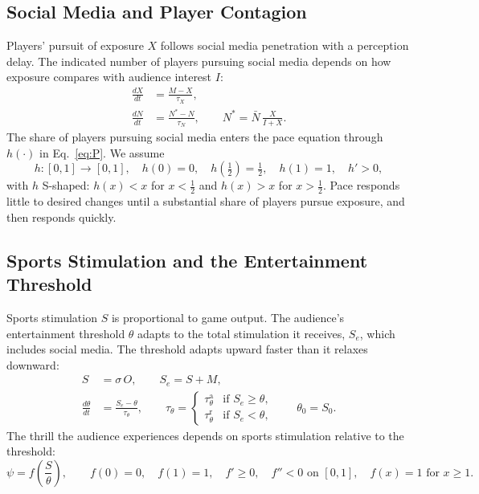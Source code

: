 \subsection{Social Media and Player Contagion}
\label{sec:model:social}

Players' pursuit of exposure $X$ follows social media penetration
with a perception delay. The indicated number of players pursuing
social media depends on how exposure compares with audience interest
$I$:
\begin{align}
  \frac{dX}{dt} &= \frac{M - X}{\tau_X},
  \label{eq:X}\\[4pt]
  \frac{dN}{dt} &= \frac{N^{*} - N}{\tau_N},
  \qquad
  N^{*} = \bar{N}\, \frac{X}{I + X}.
  \label{eq:N}
\end{align}
The share of players pursuing social media enters the pace equation
through $h(\cdot)$ in Eq.~\eqref{eq:P}. We assume
\begin{equation}
  h:[0,1]\to[0,1],\quad h(0)=0,\quad h\!\left(\tfrac12\right)=\tfrac12,
  \quad h(1)=1,\quad h'>0,
  \label{eq:h}
\end{equation}
with $h$ S-shaped: $h(x) < x$ for $x < \tfrac12$ and $h(x) > x$ for
$x > \tfrac12$. Pace responds little to desired changes until a
substantial share of players pursue exposure, and then responds
quickly.


\subsection{Sports Stimulation and the Entertainment Threshold}
\label{sec:model:threshold}

Sports stimulation $S$ is proportional to game output. The audience's
entertainment threshold $\theta$ adapts to the total stimulation it
receives, $S_e$, which includes social media. The threshold adapts
upward faster than it relaxes downward:
\begin{align}
  S &= \sigma\, O, \qquad S_e = S + M,
  \label{eq:S}\\[4pt]
  \frac{d\theta}{dt} &= \frac{S_e - \theta}{\tau_\theta},
  \qquad
  \tau_\theta =
  \begin{cases}
    \tau_\theta^{\mathrm{a}} & \text{if } S_e \ge \theta,\\
    \tau_\theta^{\mathrm{r}} & \text{if } S_e < \theta,
  \end{cases}
  \qquad \theta_0 = S_0 .
  \label{eq:theta}
\end{align}
The thrill the audience experiences depends on sports stimulation
relative to the threshold:
\begin{equation}
  \psi = f\!\left(\frac{S}{\theta}\right),
  \qquad
  f(0)=0,\quad f(1)=1,\quad f'\ge 0,\quad f''<0 \text{ on } [0,1],
  \quad f(x)=1 \text{ for } x \ge 1 .
  \label{eq:psi}
\end{equation}

